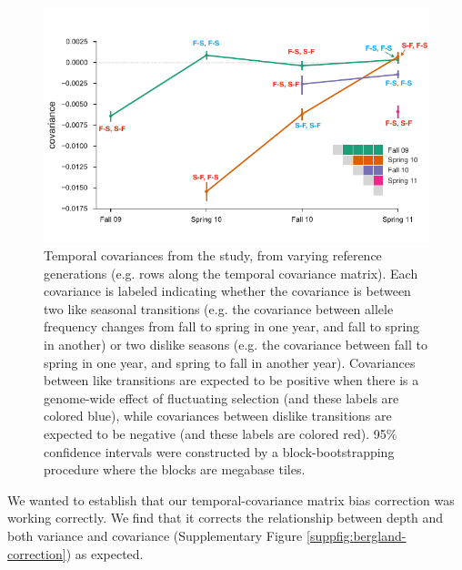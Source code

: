 \documentclass[11pt]{article}
\begin{document}
\begin{figure}[!ht]
  \centering
  \includegraphics[]{figures/bergland-covs-figure.pdf}

  \caption{Temporal covariances from the \textcite{Bergland2014-ij} study, from
    varying reference generations (e.g. rows along the temporal covariance
    matrix). Each covariance is labeled indicating whether the covariance is
    between two like seasonal transitions (e.g. the covariance between allele
    frequency changes from fall to spring in one year, and fall to spring in
    another) or two dislike seasons (e.g. the covariance between fall to spring
    in one year, and spring to fall in another year). Covariances between like
    transitions are expected to be positive when there is a genome-wide effect
    of fluctuating selection (and these labels are colored blue), while
    covariances between dislike transitions are expected to be negative (and
    these labels are colored red). 95\% confidence intervals were constructed
    by a block-bootstrapping procedure where the blocks are megabase tiles.}

  \label{suppfig:bergland-covs-figure}
\end{figure}

We wanted to establish that our temporal-covariance matrix bias correction was
working correctly. We find that it corrects the relationship between depth and
both variance and covariance (Supplementary Figure
\ref{suppfig:bergland-correction}) as expected.
\end{document}
